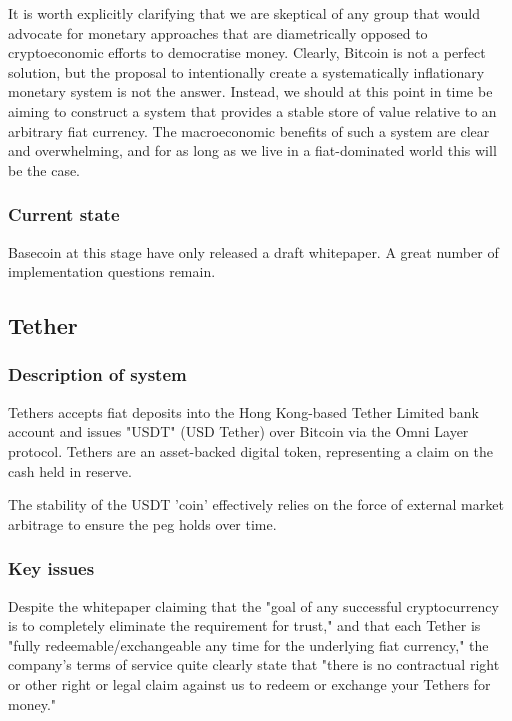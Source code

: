 \documentclass{article}
\begin{document}
\noindent It is worth explicitly clarifying that we are skeptical of any group that would advocate for monetary approaches that are diametrically opposed to cryptoeconomic efforts to democratise money. Clearly, Bitcoin is not a perfect solution, but the proposal to intentionally create a systematically inflationary monetary system is not the answer. Instead, we should at this point in time be aiming to construct a system that provides a stable store of value relative to an arbitrary fiat currency. The macroeconomic benefits of such a system are clear and overwhelming, and for as long as we live in a fiat-dominated world this will be the case.

\subsubsection{Current state}

Basecoin at this stage have only released a draft whitepaper. A great number of implementation questions remain.

\subsection{Tether}

\subsubsection{Description of system}

Tethers accepts fiat deposits into the Hong Kong-based Tether Limited bank account and issues "USDT" (USD Tether) over Bitcoin via the Omni Layer protocol. Tethers are an asset-backed digital token, representing a claim on the cash held in reserve.

The stability of the USDT 'coin' effectively relies on the force of external market arbitrage to ensure the peg holds over time.

\subsubsection{Key issues}

Despite the whitepaper claiming that the "goal of any successful cryptocurrency is to completely eliminate the requirement for trust," and that each Tether is "fully redeemable/exchangeable any time for the underlying fiat currency," the company's terms of service quite clearly state that "there is no contractual right or other right or legal claim against us to redeem or exchange your Tethers for money."
\end{document}
